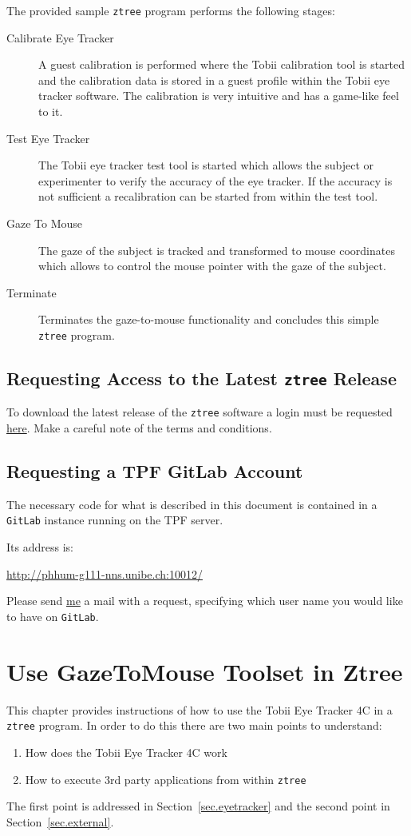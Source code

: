 \documentclass[a4paper,oneside]{book}
\begin{document}
The provided sample \texttt{ztree} program performs the following stages:
\begin{description}
    \item[Calibrate Eye Tracker]
        A guest calibration is performed where the Tobii calibration tool is started and the calibration data is stored in a guest profile within the Tobii eye tracker software.
        The calibration is very intuitive and has a game-like feel to it.
    \item[Test Eye Tracker]
        The Tobii eye tracker test tool is started which allows the subject or experimenter to verify the accuracy of the eye tracker.
        If the accuracy is not sufficient a recalibration can be started from within the test tool.
    \item[Gaze To Mouse]
        The gaze of the subject is tracked and transformed to mouse coordinates which allows to control the mouse pointer with the gaze of the subject.
    \item[Terminate]
        Terminates the gaze-to-mouse functionality and concludes this simple \texttt{ztree} program.
\end{description}

\section{Requesting Access to the Latest \texttt{ztree} Release}
\label{sec.ztree}
To download the latest release of the \texttt{ztree} software a login must be requested \href{https://www.uzh.ch/ztree/ssl-dir/index.php?action=obtain}{here}.
Make a careful note of the terms and conditions.

\section{Requesting a TPF GitLab Account}
\label{sec.gitlab}
The necessary code for what is described in this document is contained in a \texttt{GitLab} instance running on the TPF server.

Its address is:

\url{http://phhum-g111-nns.unibe.ch:10012/}

Please send \href{simon.maurer@humdek.unibe.ch}{me} a mail with a request, specifying which user name you would like to have on \texttt{GitLab}.


\chapter{Use GazeToMouse Toolset in Ztree}
\label{sec.gazetomouse}
This chapter provides instructions of how to use the Tobii Eye Tracker 4C in a \texttt{ztree} program.
In order to do this there are two main points to understand:
\begin{enumerate}
    \item How does the Tobii Eye Tracker 4C work
    \item How to execute 3rd party applications from within \texttt{ztree}
\end{enumerate}
The first point is addressed in Section~\ref{sec.eyetracker} and the second point in Section~\ref{sec.external}.
\end{document}
